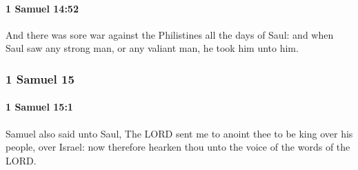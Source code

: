 		\paragraph{1 Samuel 14:52} %
			\label{1SAMUEL-14-52}

			And there was sore war against the Philistines all the days of Saul: and when Saul saw any strong man, or any valiant man, he took him unto him.

	\subsubsection{1 Samuel 15} %
		\label{1SAMUEL-15}

		\paragraph{1 Samuel 15:1} %
			\label{1SAMUEL-15-1}

			Samuel also said unto Saul, The LORD sent me to anoint thee to be king over his people, over Israel: now therefore hearken thou unto the voice of the words of the LORD.

